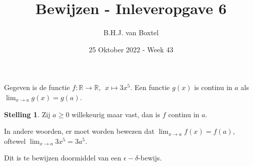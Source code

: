 \documentclass[12pt, dutch, a4paper]{article}
\title{Bewijzen - Inleveropgave 6}
\author{B.H.J. van Boxtel}
\date{25 Oktober 2022 - Week 43}
\theoremstyle{definition}
\newtheorem{theorem}{Stelling}
\begin{document}
\maketitle  
{} 

Gegeven is de functie 
$f: \mathbb{R} \longrightarrow \mathbb{R}, \: \: x \mapsto 3x^5$.
Een functie $g(x)$ is continu in $a$ als $\lim_{x\to a} g(x) = g(a)$.

\begin{theorem}
  Zij $a \geq 0$ willekeurig maar vast, dan is $f$ continu in $a$.
\end{theorem}

In andere woorden, er moet worden bewezen dat $\lim_{x\to a} f(x) = f(a)$, 
oftewel $\lim_{x\to a}3x^5 = 3a^5$.

Dit is te bewijzen doormiddel van een $\epsilon-\delta$-bewijs.
\end{document}
